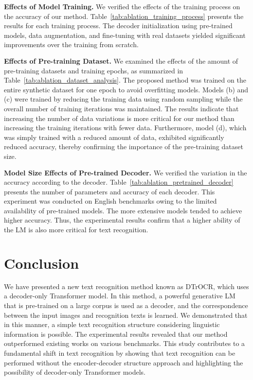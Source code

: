 \documentclass[10pt,twocolumn,letterpaper]{article}
\begin{document}
\noindent
\textbf{Effects of Model Training.}
We verified the effects of the training process on the accuracy of our method.
Table~\ref{tab:ablation_training_process} presents the results for each training process.
The decoder initialization using pre-trained models, data augmentation, and fine-tuning with real datasets yielded significant improvements over the training from scratch.

\noindent
\textbf{Effects of Pre-training Dataset.}
We examined the effects of the amount of pre-training datasets and training epochs, as summarized in Table~\ref{tab:ablation_dataset_analysis}.
The proposed method was trained on the entire synthetic dataset for one epoch to avoid overfitting models. 
Models (b) and (c) were trained by reducing the training data using random sampling while the overall number of training iterations was maintained.
The results indicate that increasing the number of data variations is more critical for our method than increasing the training iterations with fewer data.
Furthermore, model (d), which was simply trained with a reduced amount of data, exhibited significantly reduced accuracy, thereby confirming the importance of the pre-training dataset size.




\noindent
\textbf{Model Size Effects of Pre-trained Decoder.}
We verified the variation in the accuracy according to the decoder.
Table~\ref{tab:ablation_pretrained_decoder} presents the number of parameters and accuracy of each decoder.
This experiment was conducted on English benchmarks owing to the limited availability of pre-trained models.
The more extensive models tended to achieve higher accuracy. 
Thus, the experimental results confirm that a higher ability of the LM is also more critical for text recognition.
 
\section{Conclusion}\label{conclusion}
We have presented a new text recognition method known as DTrOCR, which uses a decoder-only Transformer model.
In this method, a powerful generative LM that is pre-trained on a large corpus is used as a decoder, and the correspondence between the input images and recognition texts is learned.
We demonstrated that in this manner, a simple text recognition structure considering linguistic information is possible.
The experimental results revealed that our method outperformed existing works on various benchmarks.
This study contributes to a fundamental shift in text recognition by showing that text recognition can be performed without the encoder-decoder structure approach and highlighting the possibility of decoder-only Transformer models.
 
\clearpage

{\small


}
\end{document}
